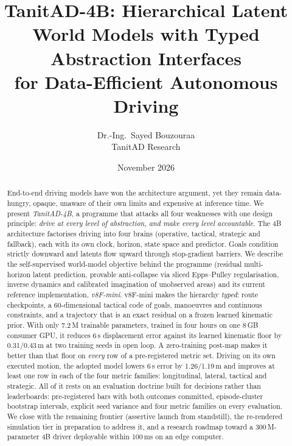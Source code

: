 \documentclass[10pt,twocolumn]{article}
\title{\vspace{-6mm}\textbf{TanitAD-4B: Hierarchical Latent World Models with Typed Abstraction Interfaces\\for Data-Efficient Autonomous Driving}}
\author{Dr.-Ing.\ Sayed Bouzouraa\\[1mm]\normalsize TanitAD Research}
\date{November 2026}
\theoremstyle{remark}
\begin{document}
\maketitle

\begin{abstract}
End-to-end driving models have won the architecture argument, yet they remain data-hungry, opaque, unaware of their own limits and
expensive at inference time. We present \emph{TanitAD-4B}, a programme that attacks all four weaknesses with one design principle:
\emph{drive at every level of abstraction, and make every level accountable}. The 4B architecture factorises driving into four
brains (operative, tactical, strategic and fallback), each with its own clock, horizon, state space and predictor. Goals condition
strictly downward and latents flow upward through stop-gradient barriers. We describe the self-supervised world-model objective
behind the programme (residual multi-horizon latent prediction, provable anti-collapse via sliced Epps--Pulley regularisation,
inverse dynamics and calibrated imagination of unobserved areas) and its current reference implementation, \emph{v8F-mini}.
v8F-mini makes the hierarchy \emph{typed}: route checkpoints, a 60-dimensional tactical code of goals, manoeuvres and continuous
constraints, and a trajectory that is an exact residual on a frozen learned kinematic prior. With only 7.2\,M trainable parameters,
trained in four hours on one 8\,GB consumer GPU, it reduces 6\,s displacement error against its learned kinematic floor by
0.31/0.43\,m at two training seeds in open loop. A zero-training post-map makes it better than that floor on \emph{every} row of a
pre-registered metric set. Driving on its own executed motion, the adopted model lowers 6\,s error by 1.26/1.19\,m and improves at
least one row in each of the four metric families: longitudinal, lateral, tactical and strategic. All of it rests on an evaluation
doctrine built for decisions rather than leaderboards: pre-registered bars with both outcomes committed, episode-cluster bootstrap
intervals, explicit seed variance and four metric families on every evaluation. We close with the remaining frontier (assertive
launch from standstill), the re-rendered simulation tier in preparation to address it, and a research roadmap toward a 300\,M-parameter
4B driver deployable within 100\,ms on an edge computer.
\end{abstract}
\end{document}
